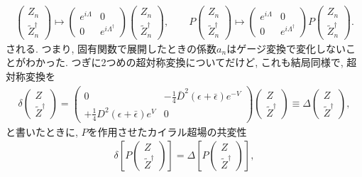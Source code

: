 \documentclass{ltjsarticle}
\theoremstyle{definition}
\begin{document}
\begin{align}
\begin{pmatrix}
Z_n\\\tilde Z^\dagger_n
\end{pmatrix}
\mapsto
\begin{pmatrix}
e^{i\Lambda}&0\\
0&e^{i\Lambda^\dagger}
\end{pmatrix}
\begin{pmatrix}
Z_n\\\tilde Z^\dagger_n
\end{pmatrix}
,\qquad
P
\begin{pmatrix}
Z_n\\\tilde Z^\dagger_n
\end{pmatrix}
\mapsto
\begin{pmatrix}
e^{i\Lambda}&0\\
0&e^{i\Lambda^\dagger}
\end{pmatrix}
P
\begin{pmatrix}
Z_n\\\tilde Z^\dagger_n
\end{pmatrix}.
\end{align}
される. つまり, 固有関数で展開したときの係数$a_n$はゲージ変換で変化しないことがわかった. つぎに2つめの超対称変換についてだけど, これも結局同様で, 超対称変換を
\begin{align}
\delta
\begin{pmatrix}
Z\\[2ex]\tilde Z^\dagger
\end{pmatrix}
=
\begin{pmatrix}
0&-\displaystyle\frac14\bar D^2(\epsilon+\bar\epsilon)e^{-V}\\[2ex]
+\displaystyle\frac14D^2(\epsilon+\bar\epsilon)e^V&0
\end{pmatrix}
\begin{pmatrix}
Z\\[2ex]\tilde Z^\dagger
\end{pmatrix}
\equiv
\Delta
\begin{pmatrix}
Z\\[2ex]\tilde Z^\dagger
\end{pmatrix},
\end{align}
と書いたときに, $P$を作用させたカイラル超場の共変性
\begin{align}
\delta\left[
P
\begin{pmatrix}
Z\\\tilde Z^\dagger
\end{pmatrix}
\right]=\Delta\left[
P
\begin{pmatrix}
Z\\\tilde Z^\dagger
\end{pmatrix}
\right],
\end{align}
\end{document}
